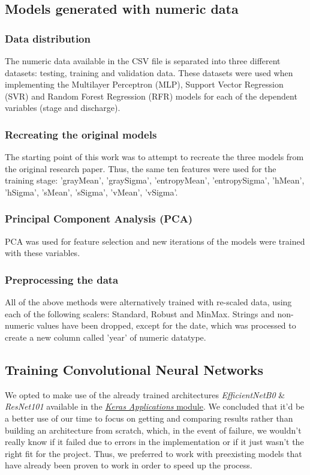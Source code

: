 \documentclass[conference]{IEEEtran}
\begin{document}
\subsection{\textbf{Models generated with numeric data}}
\subsubsection{Data distribution}
The numeric data available in the CSV file is separated into three different datasets: testing, training and validation data.
These datasets were used when implementing the Multilayer Perceptron (MLP), Support Vector Regression (SVR) and Random Forest Regression (RFR) models for each of the dependent variables (stage and discharge).
\subsubsection{Recreating the original models}
The starting point of this work was to attempt to recreate the three models from the original research paper. Thus, the same ten features were used for the training stage: 'grayMean', 'graySigma', 'entropyMean', 'entropySigma', 'hMean', 'hSigma', 'sMean', 'sSigma', 'vMean', 'vSigma'.
\subsubsection{Principal Component Analysis (PCA)}
PCA was used for feature selection and new iterations of the models were trained with these variables.
\subsubsection{Preprocessing the data}
All of the above methods were alternatively trained with re-scaled data, using each of the following scalers: Standard, Robust and MinMax. Strings and non-numeric values have been dropped, except for the date, which was processed to create a new column called 'year' of numeric datatype.

\subsection{\textbf{Training Convolutional Neural Networks}}
We opted to make use of the already trained architectures \textit{EfficientNetB0} \& \textit{ResNet101} available in the \href{https://www.tensorflow.org/api_docs/python/tf/keras/applications}{\textit{Keras Applications} module}. We concluded that it'd be a better use of our time to focus on getting and comparing results rather than building an architecture from scratch, which, in the event of failure, we wouldn't really know if it failed due to errors
in the implementation or if it just wasn't the right fit for the project. Thus, we preferred to work with preexisting models that have already been proven to work in order to speed up the process.
\end{document}
